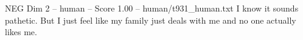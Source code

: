 \begin{textsample}{NEG Dim 2 – human – Score 1.00 – human/t931\_human.txt}  \label{ex:f2_neg_024}
I know it sounds pathetic.
But I just feel like my family just deals with me and no one actually likes me.

\end{textsample}
